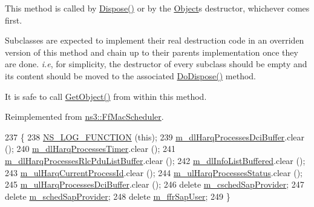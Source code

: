 This method is called by \hyperlink{classns3_1_1Object_aa90ae598863f6c251cdab3c3722afdaf}{Dispose()} or by the \hyperlink{classns3_1_1Object}{Object}\textquotesingle{}s destructor, whichever comes first.

Subclasses are expected to implement their real destruction code in an overriden version of this method and chain up to their parent\textquotesingle{}s implementation once they are done. {\itshape i.\+e}, for simplicity, the destructor of every subclass should be empty and its content should be moved to the associated \hyperlink{classns3_1_1TdTbfqFfMacScheduler_a2e3ba63463ee06a7fca95def5363be8b}{Do\+Dispose()} method.

It is safe to call \hyperlink{classns3_1_1Object_a13e18c00017096c8381eb651d5bd0783}{Get\+Object()} from within this method. 

Reimplemented from \hyperlink{classns3_1_1FfMacScheduler_a771411e455992b81d8399681779debd9}{ns3\+::\+Ff\+Mac\+Scheduler}.


\begin{DoxyCode}
237 \{
238   \hyperlink{log-macros-disabled_8h_a90b90d5bad1f39cb1b64923ea94c0761}{NS\_LOG\_FUNCTION} (\textcolor{keyword}{this});
239   \hyperlink{classns3_1_1TdTbfqFfMacScheduler_a50d8986111a3dc24130127d3ea391d7e}{m\_dlHarqProcessesDciBuffer}.clear ();
240   \hyperlink{classns3_1_1TdTbfqFfMacScheduler_a772806188cbe19e816a9eab534733ee1}{m\_dlHarqProcessesTimer}.clear ();
241   \hyperlink{classns3_1_1TdTbfqFfMacScheduler_a997b6649f2a69dd389d9a4381707b755}{m\_dlHarqProcessesRlcPduListBuffer}.clear ();
242   \hyperlink{classns3_1_1TdTbfqFfMacScheduler_aabf2460c78d16c5202cdcda020ba06dd}{m\_dlInfoListBuffered}.clear ();
243   \hyperlink{classns3_1_1TdTbfqFfMacScheduler_a418d37c6f77b19886fe25e71c103e8b1}{m\_ulHarqCurrentProcessId}.clear ();
244   \hyperlink{classns3_1_1TdTbfqFfMacScheduler_a845d3e79ce5c38b47c8ac8a7e4cc5b37}{m\_ulHarqProcessesStatus}.clear ();
245   \hyperlink{classns3_1_1TdTbfqFfMacScheduler_aa7b74d7f5898ae380db92cdd1205efae}{m\_ulHarqProcessesDciBuffer}.clear ();
246   \textcolor{keyword}{delete} \hyperlink{classns3_1_1TdTbfqFfMacScheduler_a22a19059921cf652fbce916ceca70972}{m\_cschedSapProvider};
247   \textcolor{keyword}{delete} \hyperlink{classns3_1_1TdTbfqFfMacScheduler_afeed1dc1600c32b8ecc7c1b4f805ca12}{m\_schedSapProvider};
248   \textcolor{keyword}{delete} \hyperlink{classns3_1_1TdTbfqFfMacScheduler_aa78fad6d52a8781e7ed2a51a75ae61b9}{m\_ffrSapUser};
249 \}
\end{DoxyCode}
